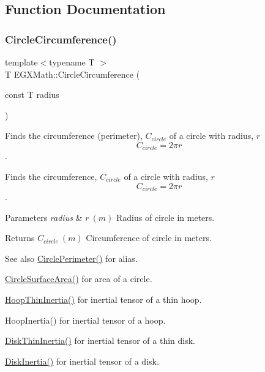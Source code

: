 \subsection{Function Documentation}
\mbox{\label{group___e_g_x_math-_geometry-2_d-_circle_gadb55695b75a06a3f3534494eb767e18e}} 
\subsubsection{\texorpdfstring{Circle\+Circumference()}{CircleCircumference()}}
{\footnotesize\ttfamily template$<$typename T $>$ \\
T E\+G\+X\+Math\+::\+Circle\+Circumference (\begin{DoxyParamCaption}\item[{const T}]{radius }\end{DoxyParamCaption})}



Finds the circumference (perimeter), $C_{circle}$ of a circle with radius, $r$ \[ C_{circle}=2 \pi r \]. 

Finds the circumference, $C_{circle}$ of a circle with radius, $r$ \[ C_{circle}=2 \pi r \].


\begin{DoxyParams}{Parameters}
{\em radius} & $ r\ (m)$ Radius of circle in meters. \\
\hline
\end{DoxyParams}
\begin{DoxyReturn}{Returns}
$ C_{circle}\ (m)$ Circumference of circle in meters. 
\end{DoxyReturn}
\begin{DoxySeeAlso}{See also}
\mbox{\hyperlink{group___e_g_x_math-_geometry-2_d-_circle_gad32d0bded2e74c52a4c41cfffd2a9e77}{Circle\+Perimeter()}} for alias. 

\mbox{\hyperlink{group___e_g_x_math-_geometry-2_d-_circle_gaa4486100a643c57bd7a80c1c11ae3f60}{Circle\+Surface\+Area()}} for area of a circle. 

\mbox{\hyperlink{group___e_g_x_math-_geometry-3_d-_hoop_gab3a84dc2aa29ce0db990425747d291c6}{Hoop\+Thin\+Inertia()}} for inertial tensor of a thin hoop. 

Hoop\+Inertia() for inertial tensor of a hoop. 

\mbox{\hyperlink{group___e_g_x_math-_geometry-3_d-_disk_ga8dcadf6cd5680294a84311c6767e3caf}{Disk\+Thin\+Inertia()}} for inertial tensor of a thin disk. 

\mbox{\hyperlink{group___e_g_x_math-_geometry-3_d-_disk_ga6ed461694b277e36a641a6550bdea68f}{Disk\+Inertia()}} for inertial tensor of a disk.
\end{DoxySeeAlso}

